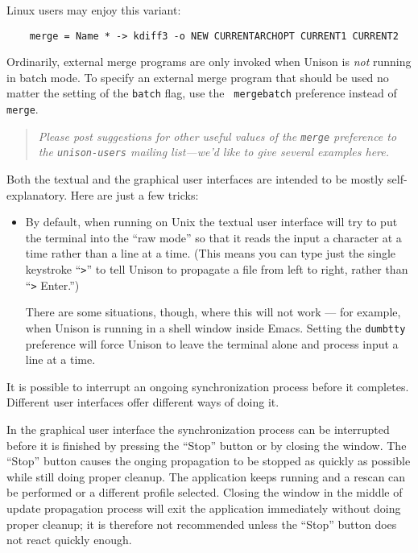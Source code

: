 \documentclass{article}
\begin{document}
Linux users may enjoy this variant:
\begin{verbatim}
    merge = Name * -> kdiff3 -o NEW CURRENTARCHOPT CURRENT1 CURRENT2
\end{verbatim}

Ordinarily, external merge programs are only invoked when Unison is {\em
  not} running in batch mode.  To specify an external merge program that
should be used no matter the setting of the {\tt batch} flag, use the {\tt
  mergebatch} preference instead of {\tt merge}.

\begin{quote}
\it
Please post suggestions for other useful values of the
\verb|merge| preference to the {\tt unison-users} mailing list---we'd like
to give several examples here.
\end{quote}



Both the textual and the graphical user interfaces are intended to be
mostly self-explanatory.  Here are just a few tricks:
\begin{itemize}
\item By default, when running on Unix the textual user interface will
try to put the terminal into the ``raw mode'' so that it reads the input a
character at a time rather than a line at a time.  (This means you can
type just the single keystroke ``\verb|>|'' to tell Unison to
propagate a file from left to right, rather than ``\verb|>| Enter.'')

There are some situations, though, where this will not work --- for
example, when Unison is running in a shell window inside Emacs.
Setting the \verb|dumbtty| preference will force Unison to leave the
terminal alone and process input a line at a time.
\end{itemize}


It is possible to interrupt an ongoing synchronization process before it
completes. Different user interfaces offer different ways of doing it.

\begin{tkui}
In the graphical user interface the synchronization process can be interrupted
before it is finished by pressing the ``Stop'' button or by closing the window.
The ``Stop'' button causes the onging propagation to be stopped as quickly as
possible while still doing proper cleanup. The application keeps running and a
rescan can be performed or a different profile selected. Closing the window in
the middle of update propagation process will exit the application immediately
without doing proper cleanup; it is therefore not recommended unless the
``Stop'' button does not react quickly enough.
\end{tkui}
\end{document}
